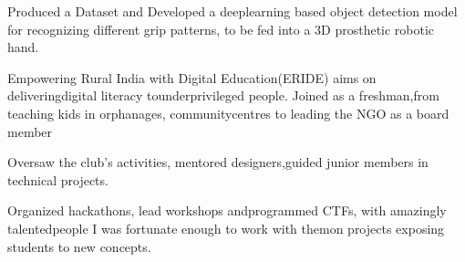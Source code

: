 \documentclass[8pt,a4paper,ragged2e,withhyper]{altacv}
\begin{document}
\begin{paracol}{2}
            \divider
            
            
            Produced a Dataset and Developed a deeplearning based object detection model for recognizing different grip patterns, to be fed into a 3D prosthetic robotic hand.

            \divider
            
            
            Empowering  Rural  India  with  Digital  Education(ERIDE)  aims  on  deliveringdigital  literacy  tounderprivileged  people.  Joined  as  a  freshman,from  teaching  kids  in  orphanages,  communitycentres to leading the NGO as a board member

            \divider

            
            Oversaw the club's activities, mentored designers,guided junior members in technical projects.

            \divider

            
            Organized  hackathons,  lead  workshops  andprogrammed  CTFs,  with  amazingly  talentedpeople I was fortunate enough to work with themon projects exposing students to new concepts.

        

\end{paracol}
\end{document}
